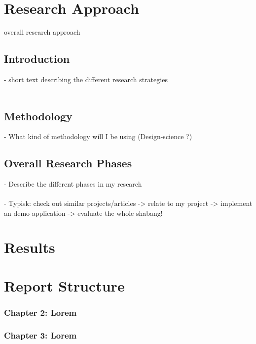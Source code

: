 \section{Research Approach}
overall research approach

\subsection{Introduction}

- short text describing the different research strategies
\\\\

\subsection{Methodology}

- What kind of methodology will I be using (Design-science ?)

\subsection{Overall Research Phases}

- Describe the different phases in my research
\\\\
- Typisk: check out similar projects/articles -> relate to my project -> implement an demo application -> evaluate the whole shabang!

\section{Results}


\section{Report Structure}

\subsubsection{Chapter 2: Lorem}

\subsubsection{Chapter 3: Lorem}